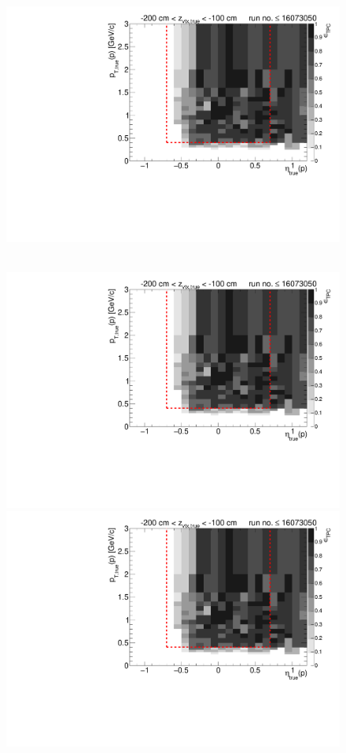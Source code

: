 \begin{figure}[hb]
{  \includegraphics[width=\linewidth,page=17]{graphics/eff/Eff2D_TPC_proton_Plus_RunRange1.pdf}
}~
\parbox{0.495\textwidth}{
  \centering
  \includegraphics[width=\linewidth,page=12]{graphics/eff/Eff2D_TPC_proton_Plus_RunRange1.pdf}\\
  \includegraphics[width=\linewidth,page=14]{graphics/eff/Eff2D_TPC_proton_Plus_RunRange1.pdf}\\
}
\end{figure}
